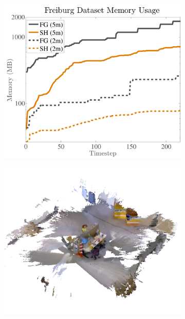 \documentclass[10pt,twocolumn,letterpaper]{article}
\begin{document}
\begin{figure}
\begin{minipage}{0.25\linewidth}
\begin{subfigure}{1.0\linewidth}
			\includegraphics[width=1.0\textwidth]{img/memoryusage2.pdf}
			 \caption{} 
			 \label{fig:memory_data2}
		 \end{subfigure}
	 \end{minipage} 
	 \begin{minipage} {0.25\linewidth} 
	  \begin{subfigure}{1.0\linewidth} \centering 
		\includegraphics[width=1.0\textwidth]{img/freiburg_5m.png}
		 \caption{}
		 \label{fig:freiburg_5m}
	 	\end{subfigure} 

\end{minipage}
\end{figure}
\end{document}
